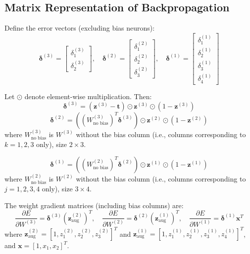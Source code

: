 \documentclass{tufte-handout}
\begin{document}
\subsection{Matrix Representation of Backpropagation}
Define the error vectors (excluding bias neurons):
\[
\boldsymbol{\delta}^{(3)} = \begin{bmatrix} \delta^{(3)}_1 \\ \delta^{(3)}_2 \end{bmatrix}, \quad
\boldsymbol{\delta}^{(2)} = \begin{bmatrix} \delta^{(2)}_1 \\ \delta^{(2)}_2 \\ \delta^{(2)}_3 \end{bmatrix}, \quad
\boldsymbol{\delta}^{(1)} = \begin{bmatrix} \delta^{(1)}_1 \\ \delta^{(1)}_2 \\ \delta^{(1)}_3 \\ \delta^{(1)}_4 \end{bmatrix}
\]

Let $\odot$ denote element-wise multiplication. Then:
\[
\boldsymbol{\delta}^{(3)} = (\mathbf{z}^{(3)} - \mathbf{t}) \odot \mathbf{z}^{(3)} \odot (1 - \mathbf{z}^{(3)})
\]
\[
\boldsymbol{\delta}^{(2)} = \left( (W^{(3)}_{\text{no bias}})^T \boldsymbol{\delta}^{(3)} \right) \odot \mathbf{z}^{(2)} \odot (1 - \mathbf{z}^{(2)})
\]
where $W^{(3)}_{\text{no bias}}$ is $W^{(3)}$ without the bias column (i.e., columns corresponding to $k=1,2,3$ only), size $2 \times 3$.

\[
\boldsymbol{\delta}^{(1)} = \left( (W^{(2)}_{\text{no bias}})^T \boldsymbol{\delta}^{(2)} \right) \odot \mathbf{z}^{(1)} \odot (1 - \mathbf{z}^{(1)})
\]
where $W^{(2)}_{\text{no bias}}$ is $W^{(2)}$ without the bias column (i.e., columns corresponding to $j=1,2,3,4$ only), size $3 \times 4$.

The weight gradient matrices (including bias columns) are:
\[
\frac{\partial E}{\partial W^{(3)}} = \boldsymbol{\delta}^{(3)} (\mathbf{z}^{(2)}_{\text{aug}})^T, \quad
\frac{\partial E}{\partial W^{(2)}} = \boldsymbol{\delta}^{(2)} (\mathbf{z}^{(1)}_{\text{aug}})^T, \quad
\frac{\partial E}{\partial W^{(1)}} = \boldsymbol{\delta}^{(1)} \mathbf{x}^T
\]
where $\mathbf{z}^{(2)}_{\text{aug}} = [1, z^{(2)}_1, z^{(2)}_2, z^{(2)}_3]^T$ and $\mathbf{z}^{(1)}_{\text{aug}} = [1, z^{(1)}_1, z^{(1)}_2, z^{(1)}_3, z^{(1)}_4]^T$, and $\mathbf{x} = [1, x_1, x_2]^T$.
\end{document}
